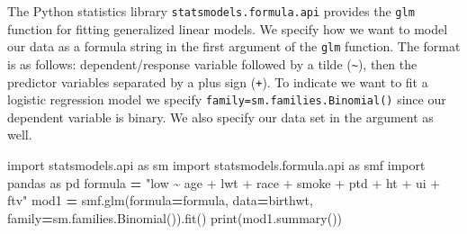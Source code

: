 \documentclass[
]{book}
\newenvironment{Shaded}{\begin{snugshade}}{\end{snugshade}}
\newcommand{\BuiltInTok}[1]{#1}
\newcommand{\ImportTok}[1]{#1}
\newcommand{\NormalTok}[1]{#1}
\newcommand{\OperatorTok}[1]{\textcolor[rgb]{0.81,0.36,0.00}{\textbf{#1}}}
\newcommand{\StringTok}[1]{\textcolor[rgb]{0.31,0.60,0.02}{#1}}
\begin{document}
The Python statistics library \texttt{statsmodels.formula.api} provides the \texttt{glm} function for fitting generalized linear models. We specify how we want to model our data as a formula string in the first argument of the \texttt{glm} function. The format is as follows: dependent/response variable followed by a tilde (\texttt{\textasciitilde{}}), then the predictor variables separated by a plus sign (\texttt{+}). To indicate we want to fit a logistic regression model we specify \texttt{family=sm.families.Binomial()} since our dependent variable is binary. We also specify our data set in the argument as well.

\begin{Shaded}
\begin{Highlighting}[]
\ImportTok{import}\NormalTok{ statsmodels.api }\ImportTok{as}\NormalTok{ sm}
\ImportTok{import}\NormalTok{ statsmodels.formula.api }\ImportTok{as}\NormalTok{ smf}
\ImportTok{import}\NormalTok{ pandas }\ImportTok{as}\NormalTok{ pd}
\NormalTok{formula }\OperatorTok{=} \StringTok{"low \textasciitilde{} age + lwt + race + smoke + ptd + ht + ui + ftv"}
\NormalTok{mod1 }\OperatorTok{=}\NormalTok{ smf.glm(formula}\OperatorTok{=}\NormalTok{formula, data}\OperatorTok{=}\NormalTok{birthwt,}
\NormalTok{               family}\OperatorTok{=}\NormalTok{sm.families.Binomial()).fit()}
\BuiltInTok{print}\NormalTok{(mod1.summary())}
\end{Highlighting}
\end{Shaded}
\end{document}
